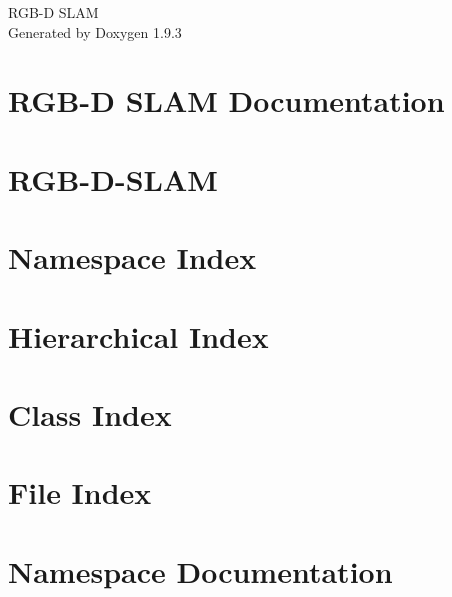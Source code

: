 \documentclass[twoside]{book}
\newcommand{\+}{\discretionary{\mbox{\scriptsize$\hookleftarrow$}}{}{}}
\newcommand{\clearemptydoublepage}{%
    \newpage{\pagestyle{empty}\cleardoublepage}%
  }
\begin{document}
  \raggedbottom
    \hypersetup{pageanchor=false,
                bookmarksnumbered=true,
                pdfencoding=unicode
               }
  \begin{titlepage}
  \vspace*{7cm}
  \begin{center}%
  {\Large RGB-\/\+D SLAM}\\
  \vspace*{1cm}
  {\large Generated by Doxygen 1.9.3}\\
  \end{center}
  \end{titlepage}
  \clearemptydoublepage
  \tableofcontents
  \clearemptydoublepage
  \hypersetup{pageanchor=true}
\chapter{RGB-\/D SLAM Documentation}
\label{index}\hypertarget{index}{}
\chapter{RGB-\/\+D-\/\+SLAM}
\label{md__home_baptisteh__documents_code_robots__r_g_b__s_l_a_m__r_g_b__d__s_l_a_m__r_e_a_d_m_e}

\chapter{Namespace Index}

\chapter{Hierarchical Index}

\chapter{Class Index}

\chapter{File Index}

\chapter{Namespace Documentation}











\end{document}
